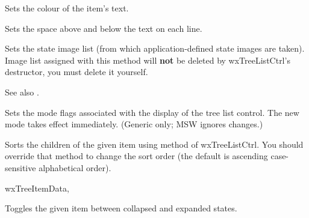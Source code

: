 \label{wxtreelistctrlsetitemtextcolour}


Sets the colour of the item's text.

\label{wxtreelistctrlsetindent}


Sets the space above and below the text on each line.

\label{wxtreelistctrlsetstateimagelist}


Sets the state image list (from which application-defined state images are taken).
Image list assigned with this method will
{\bf not} be deleted by wxTreeListCtrl's destructor, you must delete it yourself.

See also .


Sets the mode flags associated with the display of the tree list control.
The new mode takes effect immediately.
(Generic only; MSW ignores changes.)

\label{wxtreelistctrlsortchildren}


Sorts the children of the given item using
 method of wxTreeListCtrl. You
should override that method to change the sort order (the default is ascending
case-sensitive alphabetical order).


wxTreeItemData, 

\label{wxtreelistctrltoggle}


Toggles the given item between collapsed and expanded states.

\label{wxtreelistctrlunselect}

